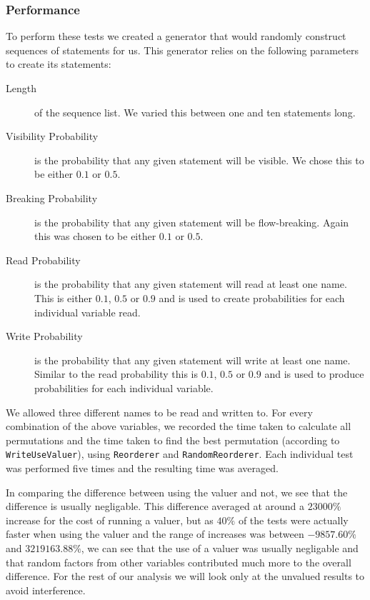 \documentclass[twoside,a4paper]{report}
\begin{document}
\subsubsection{Performance}

To perform these tests we created a generator that would randomly construct sequences of statements for us. This generator relies on the following
parameters to create its statements:

\begin{description}
\item[Length] of the sequence list. We varied this between one and ten statements long.
\item[Visibility Probability] is the probability that any given statement will be visible. We chose this to be either $0.1$ or $0.5$.
\item[Breaking Probability] is the probability that any given statement will be flow-breaking. Again this was chosen to be either $0.1$ or $0.5$.
\item[Read Probability] is the probability that any given statement will read at least one name. This is either $0.1$, $0.5$ or $0.9$ and is used to create
probabilities for each individual variable read.
\item[Write Probability] is the probability that any given statement will write at least one name. Similar to the read probability this is $0.1$, $0.5$ or $0.9$ and
is used to produce probabilities for each individual variable.
\end{description}

We allowed three different names to be read and written to. For every combination of the above variables, we recorded the time taken to calculate all
permutations and the time taken to find the best permutation (according to \texttt{WriteUseValuer}), using \texttt{Reorderer} and \texttt{RandomReorderer}.
Each individual test was performed five times and the resulting time was averaged.

In comparing the difference between using the valuer and not, we see that the difference is usually negligable. This difference averaged at around a $23000\%$
increase for the cost of running a valuer, but as $40\%$ of the tests were actually faster when using the valuer and the range of increases was between
$-9857.60\%$ and $3219163.88\%$, we can see that the use of a valuer was usually negligable and that random factors from other variables contributed much more to
the overall difference. For the rest of our analysis we will look only at the unvalued results to avoid interference.
\end{document}
